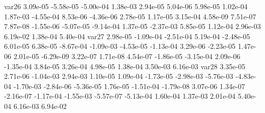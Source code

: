 var26  3.09e-05 -5.58e-05 -5.00e-04  1.38e-03  2.94e-05  5.04e-06  5.98e-05  1.02e-04  1.87e-03 -4.55e-04  8.53e-06 -4.36e-06  2.78e-05  1.17e-05  3.15e-04  4.58e-09  7.51e-07  7.87e-08 -1.55e-06 -5.07e-05 -9.14e-04  1.37e-05 -2.37e-03  5.85e-05  1.12e-04  2.96e-03  6.19e-02  1.38e-04  5.40e-04
var27  2.98e-05 -1.09e-04 -2.51e-04  5.19e-04 -2.48e-05  6.01e-05  6.38e-05 -8.67e-04 -1.09e-03 -4.53e-05 -1.13e-04  3.29e-06 -2.23e-05  1.47e-06  2.01e-05 -6.29e-09  3.22e-07  1.71e-08  4.54e-07 -1.86e-05 -3.15e-04  2.09e-06 -1.35e-04  3.84e-05  3.26e-04  4.98e-05  1.38e-04  3.50e-03  6.16e-03
var28  3.35e-05  2.71e-06 -1.04e-03  2.94e-03  1.10e-05  1.09e-04 -1.73e-05 -2.98e-03 -5.76e-03 -4.83e-04 -1.70e-03 -2.84e-06 -5.36e-05  1.76e-05 -1.51e-04 -1.79e-08  3.07e-06  1.34e-07 -2.16e-07 -1.17e-04 -1.55e-03 -5.57e-07 -5.13e-04  1.60e-04  1.37e-03  2.01e-04  5.40e-04  6.16e-03  6.94e-02



